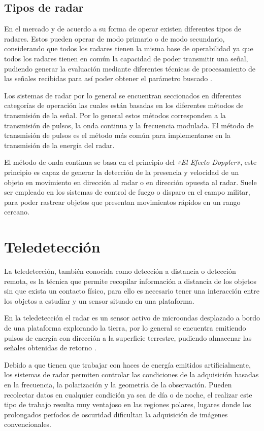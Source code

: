 \subsection{Tipos de radar}	

En el mercado y de acuerdo a su forma de operar existen diferentes tipos de radares. Estos pueden operar de modo primario o de modo secundario, considerando que todos los radares tienen la misma base de operabilidad ya que todos los radares tienen en común la capacidad de poder transmitir una señal, pudiendo generar la evaluación mediante diferentes técnicas de procesamiento de las señales recibidas para así poder obtener el parámetro buscado \cite{AcostaOsorio2014Mar}. 

Los sistemas de radar por lo general se encuentran seccionados en diferentes categorías de operación las cuales están basadas en los diferentes métodos de transmisión de la señal. Por lo general estos métodos corresponden a la transmisión de pulsos, la onda continua y la frecuencia modulada. El método de transmisión de pulsos es el método más común para implementarse en la transmisión de la energía del radar. 

El método de onda continua se basa en el principio del \textit{«El Efecto Doppler»}, este principio es capaz de generar la detección de la presencia y velocidad de un objeto en movimiento en dirección al radar o en dirección opuesta al radar. Suele ser empleado en los sistemas de control de fuego o disparo en el campo militar, para poder rastrear objetos que presentan movimientos rápidos en un rango cercano.


\section{Teledetección}

La teledetección, también conocida como detección a distancia o detección remota, es la técnica que permite recopilar información a distancia de los objetos sin que exista un contacto físico, para ello es necesario tener una interacción entre los objetos a estudiar y un sensor situado en una plataforma.

En la teledetección el radar es un sensor activo de microondas desplazado a bordo de una plataforma explorando la tierra, por lo general se encuentra emitiendo pulsos de energía con dirección a la superficie terrestre, pudiendo almacenar las señales obtenidas de retorno \cite{Marchionni2014}. 

Debido a que tienen que trabajar con haces de energía emitidos artificialmente, los sistemas de radar permiten controlar las condiciones de la adquisición basadas en la frecuencia, la polarización y la geometría de la observación. Pueden recolectar datos en cualquier condición ya sea de día o de noche, el realizar este tipo de trabajo resulta muy ventajoso en las regiones polares, lugares donde los prolongados períodos de oscuridad dificultan la adquisición de imágenes convencionales. 

